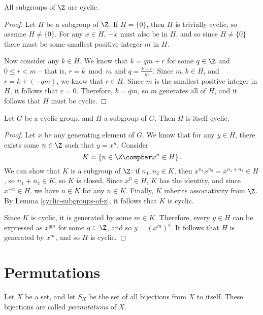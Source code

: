 \documentclass[12pt]{article}
\begin{document}
\begin{lemma}\label{cyclic-subgroups-of-z}
    All subgroups of $\Z$ are cyclic.
\end{lemma}

\begin{proof}
    Let $H$ be a subgroup of $\Z$. If $H = \{0\}$, then $H$ is trivially cyclic, so assume $H \neq \{0\}$. For any $x \in H$, $-x$ must also be in $H$, and so since $H \neq \{0\}$ there must be some smallest positive integer $m$ in $H$.

    Now consider any $k \in H$. We know that $k = qm + r$ for some $q \in \Z$ and $0 \leq r < m$ -- that is, $r = k \bmod m$ and $q = \frac{k - r}{m}$. Since $m, k \in H$, and $r = k + (-qm)$, we know that $r \in H$. Since $m$ is the smallest positive integer in $H$, it follows that $r = 0$. Therefore, $k = qm$, so $m$ generates all of $H$, and it follows that $H$ must be cyclic.
\end{proof}

\begin{thm}
    Let $G$ be a cyclic group, and $H$ a subgroup of $G$. Then $H$ is itself cyclic.
\end{thm}

\begin{proof}
    Let $x$ be any generating element of $G$. We know that for any $y \in H$, there exists some $n \in \Z$ such that $y = x^n$. Consider \[K = \left\{n \in \Z \compbar x^n \in H\right\}.\] We can show that $K$ is a subgroup of $\Z$: if $n_1, n_2 \in K$, then $x^{n_1}x^{n_2} = x^{n_1 + n_2} \in H$, so $n_1 + n_2 \in K$, so $K$ is closed. Since $x^0 \in H$, $K$ has the identity, and since $x^{-n} \in H$, we have $n \in K$ for any $n \in K$. Finally, $K$ inherits associativity from $\Z$. By Lemma \ref{cyclic-subgroups-of-z}, it follows that $K$ is cyclic.

    Since $K$ is cyclic, it is generated by some $m \in K$. Therefore, every $y \in H$ can be expressed as $x^{qm}$ for some $q \in \Z$, and so $y = (x^m)^q$. It follows that $H$ is generated by $x^m$, and so $H$ is cyclic.
\end{proof}

\section{Permutations}

\begin{defn}
    Let $X$ be a set, and let $S_X$ be the set of all bijections from $X$ to itself. These bijections are called \emph{permutations} of $X$.
\end{defn}
\end{document}
